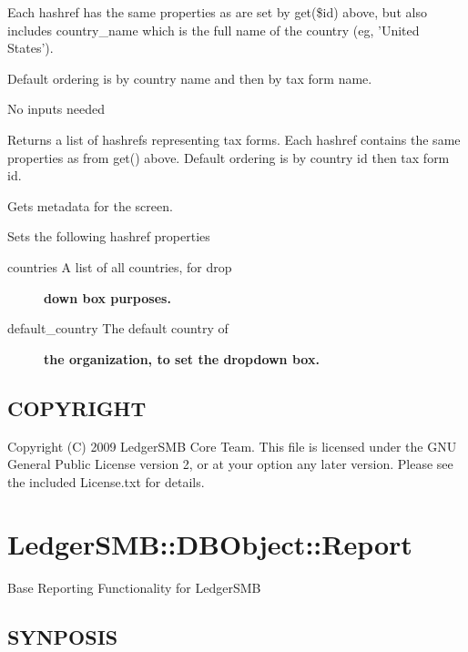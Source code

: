 \begin{description}
\begin{description}
\begin{description}
\begin{description}
\begin{description}
\begin{description}
\begin{description}
\begin{description}
\begin{description}
\begin{description}
\begin{description}
Each hashref has the same properties as are set by get(\$id) above, but also
includes country\_name which is the full name of the country (eg, 'United 
States').



Default ordering is by country name and then by tax form name.


\item[{get\_forms}] \mbox{}

No inputs needed



Returns a list of hashrefs representing tax forms.  Each hashref contains
the same properties as from get() above.  Default ordering is by country id
then tax form id.


\item[{get\_metadata}] \mbox{}

Gets metadata for the screen.



Sets the following hashref properties

\begin{description}

\item[{countries A list of all countries, for drop}] \textbf{down box purposes.}
\item[{default\_country The default country of}] \textbf{the organization, to set the dropdown box.}\end{description}
\end{description}
\subsection*{COPYRIGHT\label{LedgerSMB::DBObject::TaxFormm_COPYRIGHT}}


Copyright (C) 2009 LedgerSMB Core Team.  This file is licensed under the GNU 
General Public License version 2, or at your option any later version.  Please
see the included License.txt for details.

\section{LedgerSMB::DBObject::Report\label{LedgerSMB::DBObject::Report}}


Base Reporting Functionality for LedgerSMB

\subsection*{SYNPOSIS\label{LedgerSMB::DBObject::Report_SYNPOSIS}}



\end{description}
\end{description}
\end{description}
\end{description}
\end{description}
\end{description}
\end{description}
\end{description}
\end{description}
\end{description}
